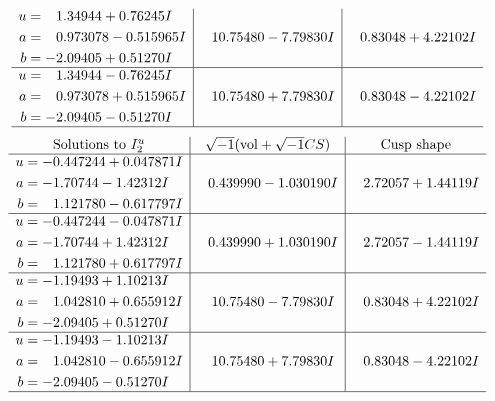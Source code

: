 \documentclass[1p]{elsarticle_modified}
\theoremstyle{definition}
\newcommand{\I}{\sqrt{-1}}
\begin{document}
$$\begin{array}{c|c|c}
\begin{aligned}
u &= \phantom{-}1.34944 + 0.76245 I \\
a &= \phantom{-}0.973078 - 0.515965 I \\
b &= -2.09405 + 0.51270 I\end{aligned}
 & \phantom{-}10.75480 - 7.79830 I & \phantom{-}0.83048 + 4.22102 I \\ \hline\begin{aligned}
u &= \phantom{-}1.34944 - 0.76245 I \\
a &= \phantom{-}0.973078 + 0.515965 I \\
b &= -2.09405 - 0.51270 I\end{aligned}
 & \phantom{-}10.75480 + 7.79830 I & \phantom{-}0.83048 - 4.22102 I\\
 \hline 
 \end{array}$$\newpage$$\begin{array}{c|c|c}  
\text{Solutions to }I^u_{2}& \I (\text{vol} + \sqrt{-1}CS) & \text{Cusp shape}\\
 \hline 
\begin{aligned}
u &= -0.447244 + 0.047871 I \\
a &= -1.70744 - 1.42312 I \\
b &= \phantom{-}1.121780 - 0.617797 I\end{aligned}
 & \phantom{-}0.439990 - 1.030190 I & \phantom{-}2.72057 + 1.44119 I \\ \hline\begin{aligned}
u &= -0.447244 - 0.047871 I \\
a &= -1.70744 + 1.42312 I \\
b &= \phantom{-}1.121780 + 0.617797 I\end{aligned}
 & \phantom{-}0.439990 + 1.030190 I & \phantom{-}2.72057 - 1.44119 I \\ \hline\begin{aligned}
u &= -1.19493 + 1.10213 I \\
a &= \phantom{-}1.042810 + 0.655912 I \\
b &= -2.09405 + 0.51270 I\end{aligned}
 & \phantom{-}10.75480 - 7.79830 I & \phantom{-}0.83048 + 4.22102 I \\ \hline\begin{aligned}
u &= -1.19493 - 1.10213 I \\
a &= \phantom{-}1.042810 - 0.655912 I \\
b &= -2.09405 - 0.51270 I\end{aligned}
 & \phantom{-}10.75480 + 7.79830 I & \phantom{-}0.83048 - 4.22102 I\\
 \hline 
 \end{array}$$\newpage\newpage\renewcommand{\arraystretch}{1}
\end{document}
